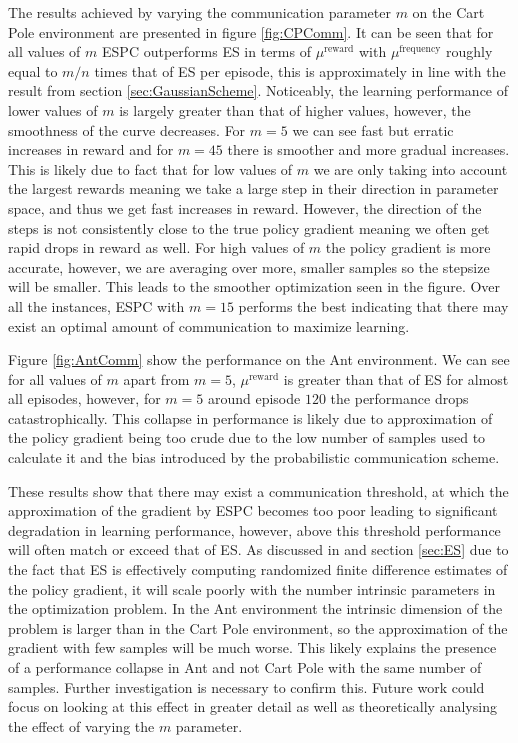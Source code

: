 The results achieved by varying the communication parameter $m$ on the Cart Pole environment are presented in figure \ref{fig:CPComm}. It can be seen that for all values of $m$ ESPC outperforms ES in terms of $\mu^{\text{reward}}$ with $\mu^{\text{frequency}}$ roughly equal to $m/n$ times that of ES per episode, this is approximately in line with the result from section \ref{sec:GaussianScheme}. Noticeably, the learning performance of lower values of $m$ is largely greater than that of higher values, however, the smoothness of the curve decreases. For $m=5$ we can see fast but erratic increases in reward and for $m=45$ there is smoother and more gradual increases. This is likely due to fact that for low values of $m$ we are only taking into account the largest rewards meaning we take a large step in their direction in parameter space, and thus we get fast increases in reward. However, the direction of the steps is not consistently close to the true policy gradient meaning we often get rapid drops in reward as well. For high values of $m$ the policy gradient is more accurate, however, we are averaging over more, smaller samples so the stepsize will be smaller. This leads to the smoother optimization seen in the figure. Over all the instances, ESPC with $m=15$ performs the best indicating that there may exist an optimal amount of communication to maximize learning. 

Figure \ref{fig:AntComm} show the performance on the Ant environment. We can see for all values of $m$ apart from $m=5$, $\mu^{\text{reward}}$ is greater than that of ES for almost all episodes, however, for $m=5$ around episode $120$ the performance drops catastrophically. This collapse in performance is likely due to approximation of the policy gradient being too crude due to the low number of samples used to calculate it and the bias introduced by the probabilistic communication scheme. 

These results show that there may exist a communication threshold, at which the approximation of the gradient by ESPC becomes too poor leading to significant degradation in learning performance, however, above this threshold performance will often match or exceed that of ES. 
As discussed in \cite{ES} and section \ref{sec:ES} due to the fact that ES is effectively computing randomized finite difference estimates of the policy gradient, it will scale poorly with the number intrinsic parameters in the optimization problem.
In the Ant environment the intrinsic dimension of the problem is larger than in the Cart Pole environment, so the approximation of the gradient with few samples will be much worse. This likely explains the presence of a performance collapse in Ant and not Cart Pole with the same number of samples.
Further investigation is necessary to confirm this. Future work could focus on looking at this effect in greater detail as well as theoretically analysing the effect of varying the $m$ parameter.

